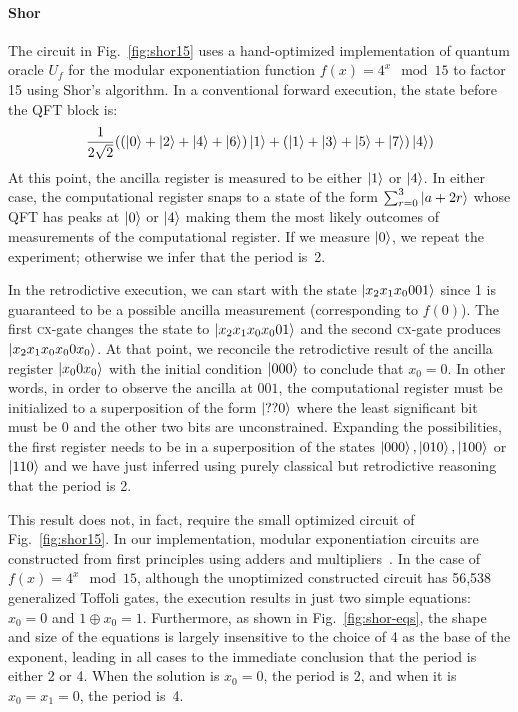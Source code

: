 \documentclass[sigplan,screen]{acmart}
\newcommand{\cx}{\textsc{cx}}
\theoremstyle{definition}
\begin{document}
\paragraph*{Shor}
The circuit in Fig.~\ref{fig:shor15} uses a hand-optimized
implementation of quantum oracle $U_f$ for the modular exponentiation
function $f(x) = 4^x \mod{15}$ to factor 15 using Shor's algorithm.
In a conventional forward execution, the state before the QFT block
is:
\[
\frac{1}{2\sqrt{2}} (
  (\ket{0} + \ket{2} + \ket{4} + \ket{6}) \ket{1} +
  (\ket{1} + \ket{3} + \ket{5} + \ket{7}) \ket{4}
  )
\]
At this point, the ancilla register is measured to be either $\ket{1}$ or
$\ket{4}$. In either case, the computational register snaps to a state
of the form $\sum_{r=0}^3 \ket{a+2r}$ whose QFT has peaks at $\ket{0}$
or $\ket{4}$ making them the most likely outcomes of measurements of
the computational register. If we measure $\ket{0}$, we repeat the
experiment; otherwise we infer that the period is~2.

In the retrodictive execution, we can start with the state
$\ket{x_2x_1x_0001}$ since 1 is guaranteed to be a possible ancilla
measurement (corresponding to $f(0)$). The first \cx-gate changes the
state to $\ket{x_2x_1x_0x_001}$ and the second \cx-gate produces
$\ket{x_2x_1x_0x_00x_0}$. At that point, we reconcile the retrodictive
result of the ancilla register $\ket{x_00x_0}$ with the initial
condition $\ket{000}$ to conclude that $x_0=0$. In other words, in
order to observe the ancilla at $001$, the computational register must
be initialized to a superposition of the form $\ket{??0}$ where the
least significant bit must be 0 and the other two bits are
unconstrained. Expanding the possibilities, the first register needs
to be in a superposition of the states $\ket{000}, \ket{010},
\ket{100}$ or $\ket{110}$ and we have just inferred using purely
classical but retrodictive reasoning that the period is
2.

This result does not, in fact, require the small optimized circuit of
Fig.~\ref{fig:shor15}. In our implementation, modular exponentiation
circuits are constructed from first principles using adders and
multipliers~\cite{PhysRevA.54.147}. In the case of $f(x) = 4^x
\mod{15}$, although the unoptimized constructed circuit has 56,538
generalized Toffoli gates,
the execution results in just two simple equations: $x_0 = 0$ and $1
\oplus x_0 = 1$. Furthermore, as shown in Fig.~\ref{fig:shor-eqs}, the
shape and size of the equations is largely insensitive to the choice
of 4 as the base of the exponent, leading in all cases to the
immediate conclusion that the period is either 2 or 4. When the
solution is $x_0=0$, the period is 2, and when it is $x_0=x_1=0$, the
period is~4.
\end{document}
